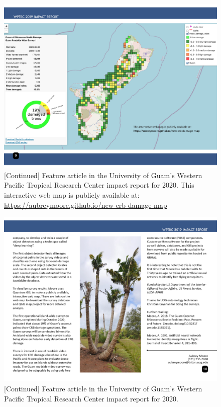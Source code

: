 \documentclass[12pt,letterpaper,english,bibliography=totocnumbered,abstract=on]{scrartcl}
\begin{document}
\begin{figure}[h]
	\centering
	\includegraphics[width=1\linewidth]{images/impact-report09.png}
	\caption{[Continued] Feature article in the University of Guam's Western Pacific Tropical Research Center impact report for 2020. This interactive web map is publicly available at: \url{https://aubreymoore.github.io/new-crb-damage-map}}
	\label{fig:roadside1-3}
\end{figure}

\begin{figure}[h]
	\centering
	\includegraphics[width=1\linewidth]{images/impact-report10.png}
	\caption{[Continued] Feature article in the University of Guam's Western Pacific Tropical Research Center impact report for 2020.}
	\label{fig:roadside1-4}
\end{figure}
\end{document}
